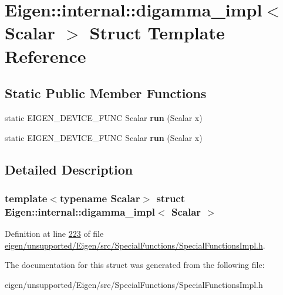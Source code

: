 \hypertarget{struct_eigen_1_1internal_1_1digamma__impl}{}\section{Eigen\+:\+:internal\+:\+:digamma\+\_\+impl$<$ Scalar $>$ Struct Template Reference}
\label{struct_eigen_1_1internal_1_1digamma__impl}
\subsection*{Static Public Member Functions}
\begin{DoxyCompactItemize}
\item 
\mbox{\label{struct_eigen_1_1internal_1_1digamma__impl_a55a556100db7911f893d5898b345a953}} 
static E\+I\+G\+E\+N\+\_\+\+D\+E\+V\+I\+C\+E\+\_\+\+F\+U\+NC Scalar {\bfseries run} (Scalar x)
\item 
\mbox{\label{struct_eigen_1_1internal_1_1digamma__impl_a55a556100db7911f893d5898b345a953}} 
static E\+I\+G\+E\+N\+\_\+\+D\+E\+V\+I\+C\+E\+\_\+\+F\+U\+NC Scalar {\bfseries run} (Scalar x)
\end{DoxyCompactItemize}


\subsection{Detailed Description}
\subsubsection*{template$<$typename Scalar$>$\newline
struct Eigen\+::internal\+::digamma\+\_\+impl$<$ Scalar $>$}



Definition at line \hyperlink{eigen_2unsupported_2_eigen_2src_2_special_functions_2_special_functions_impl_8h_source_l00223}{223} of file \hyperlink{eigen_2unsupported_2_eigen_2src_2_special_functions_2_special_functions_impl_8h_source}{eigen/unsupported/\+Eigen/src/\+Special\+Functions/\+Special\+Functions\+Impl.\+h}.



The documentation for this struct was generated from the following file\+:\begin{DoxyCompactItemize}
\item 
eigen/unsupported/\+Eigen/src/\+Special\+Functions/\+Special\+Functions\+Impl.\+h\end{DoxyCompactItemize}
